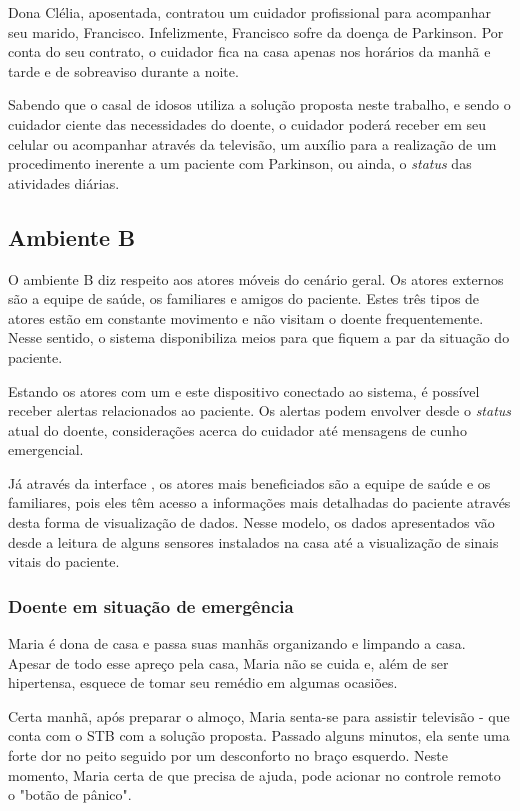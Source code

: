 Dona Clélia, aposentada, contratou um cuidador profissional para acompanhar seu
marido, Francisco. Infelizmente, Francisco sofre da doença de Parkinson. Por conta
do seu contrato, o cuidador fica na casa apenas nos horários da manhã e tarde e 
de sobreaviso durante a noite.

Sabendo que o casal de idosos utiliza a solução proposta neste trabalho, e sendo o
cuidador ciente das necessidades do doente, o cuidador poderá receber em seu celular ou
acompanhar através da televisão, um auxílio para a realização de um procedimento inerente
a um paciente com Parkinson, ou ainda, o \textit{status} das atividades diárias.

\subsection{Ambiente B} \label{subsec:ambiente-b}

O ambiente B diz respeito aos atores móveis do cenário geral. Os atores externos
são a equipe de saúde, os familiares e amigos do paciente. Estes três tipos de atores
estão em constante movimento e não visitam o doente frequentemente. Nesse
sentido, o sistema disponibiliza meios para que fiquem a par da situação do
paciente.

Estando os atores com um \smartphone[] e este dispositivo conectado ao
sistema, é possível receber alertas relacionados ao paciente. Os alertas podem
envolver desde o \textit{status} atual do doente, considerações acerca do
cuidador até mensagens de cunho emergencial.

Já através da interface \web[], os atores mais beneficiados são a equipe de
saúde e os familiares, pois eles têm acesso a informações mais detalhadas do
paciente através desta forma de visualização de dados. Nesse modelo, os dados
apresentados vão desde a leitura de alguns sensores instalados na casa até a
visualização de sinais vitais do paciente.

\subsubsection{Doente em situação de emergência}

Maria é dona de casa e passa suas manhãs organizando e limpando a casa. Apesar
de todo esse apreço pela casa, Maria não se cuida e, além de ser hipertensa,
esquece de tomar seu remédio em algumas ocasiões.

Certa manhã, após preparar o almoço, Maria senta-se para assistir televisão -
que conta com o STB com a solução proposta. Passado alguns minutos, ela sente
uma forte dor no peito seguido por um desconforto no braço esquerdo. Neste
momento, Maria certa de que precisa de ajuda, pode acionar no controle remoto o
"botão de pânico". 

